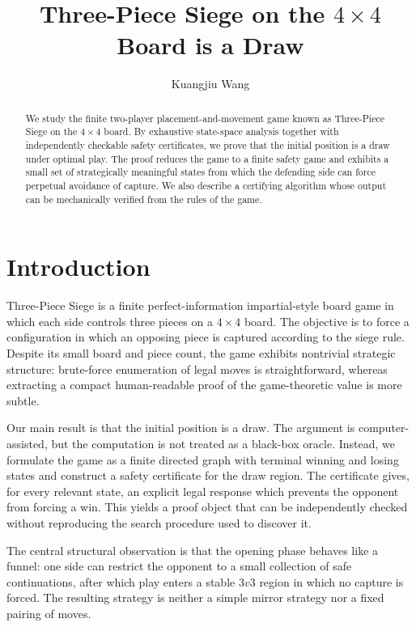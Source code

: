 \documentclass[11pt,a4paper]{article}
\title{Three-Piece Siege on the $4\times4$ Board is a Draw}
\author{Kuangjiu Wang}
\date{}
\theoremstyle{plain}
\theoremstyle{definition}
\begin{document}
\maketitle

\begin{abstract}
We study the finite two-player placement-and-movement game known as Three-Piece Siege on the $4\times4$ board. By exhaustive state-space analysis together with independently checkable safety certificates, we prove that the initial position is a draw under optimal play. The proof reduces the game to a finite safety game and exhibits a small set of strategically meaningful states from which the defending side can force perpetual avoidance of capture. We also describe a certifying algorithm whose output can be mechanically verified from the rules of the game.
\end{abstract}

\section{Introduction}

Three-Piece Siege is a finite perfect-information impartial-style board game in which each side controls three pieces on a $4\times4$ board. The objective is to force a configuration in which an opposing piece is captured according to the siege rule. Despite its small board and piece count, the game exhibits nontrivial strategic structure: brute-force enumeration of legal moves is straightforward, whereas extracting a compact human-readable proof of the game-theoretic value is more subtle.

Our main result is that the initial position is a draw. The argument is computer-assisted, but the computation is not treated as a black-box oracle. Instead, we formulate the game as a finite directed graph with terminal winning and losing states and construct a safety certificate for the draw region. The certificate gives, for every relevant state, an explicit legal response which prevents the opponent from forcing a win. This yields a proof object that can be independently checked without reproducing the search procedure used to discover it.

The central structural observation is that the opening phase behaves like a funnel: one side can restrict the opponent to a small collection of safe continuations, after which play enters a stable $3v3$ region in which no capture is forced. The resulting strategy is neither a simple mirror strategy nor a fixed pairing of moves.
\end{document}
